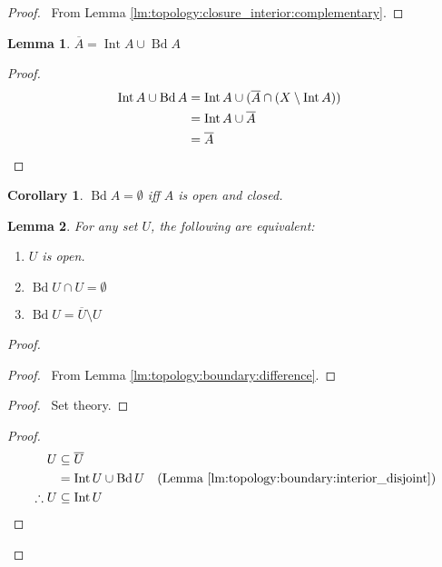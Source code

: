 \documentclass{report}
\let\qed\relax
\newtheorem{lm}{Lemma}[section]
\newtheorem{cor}{Corollary}[lm]
\theoremstyle{definition}
\newcommand{\Int}{\ensuremath{\operatorname{Int}}}
\newcommand{\Bd}{\ensuremath{\operatorname{Bd}}}
\begin{document}
  \begin{proof}
    \pf\ From Lemma \ref{lm:topology:closure_interior:complementary}. \qed
  \end{proof}

  \begin{lm}
    \label{lm:topology:boundary:interior_disjoint}
    $\overline{A} = \Int A \cup \Bd A$
  \end{lm}

  \begin{proof}
    \pf
    \begin{align*}
      \Int A \cup \Bd A & = \Int A \cup (\overline{A} \cap (X \setminus \Int
      A))
      \\
      & = \Int A \cup \overline{A} \\
      & = \overline{A} & \qed
    \end{align*}
  \end{proof}

  \begin{cor}
    $\Bd A = \emptyset$ iff $A$ is open and closed.
  \end{cor}

  \begin{lm}
    For any set $U$, the following are equivalent:
    \begin{enumerate}
      \item $U$ is open.
      \item $\Bd U \cap U = \emptyset$
      \item $\Bd U = \overline{U} \setminus U$
    \end{enumerate}
  \end{lm}

  \begin{proof}
    \pf
    \begin{proof}
      \pf\ From Lemma \ref{lm:topology:boundary:difference}.
    \end{proof}
    \begin{proof}
      \pf\ Set theory.
    \end{proof}
    \begin{proof}
      \pf
      \begin{align*}
        U & \subseteq \overline{U} \\
        & = \Int U \cup \Bd U & (\text{Lemma
          \ref{lm:topology:boundary:interior_disjoint}}) \\
        \therefore U & \subseteq \Int U
      \end{align*}
    \end{proof}
    \qed
  \end{proof}
\end{document}
